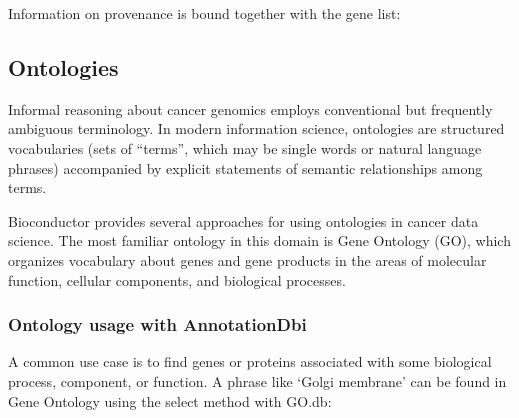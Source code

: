 Information on provenance is bound together with the gene list:

\begin{shaded}
\begin{Highlighting}[]
\end{Highlighting}
\end{shaded}

\subsection{Ontologies}\label{ontologies}

Informal reasoning about cancer genomics employs conventional
but frequently ambiguous terminology. In modern
information science, ontologies are structured vocabularies
(sets of ``terms'', which may be single words or natural language
phrases) accompanied by
explicit statements of semantic relationships among terms.

Bioconductor provides several approaches for using ontologies
in cancer data science. The most familiar ontology
in this domain is Gene Ontology (GO), which organizes vocabulary
about genes and gene products in
the areas of molecular function, cellular components, and
biological processes.

\subsubsection{Ontology usage with AnnotationDbi}\label{ontology-usage-with-annotationdbi}

A common use case is to find genes or proteins associated
with some biological process, component, or function.
A phrase like `Golgi membrane' can be found in Gene Ontology
using the select method with GO.db:

